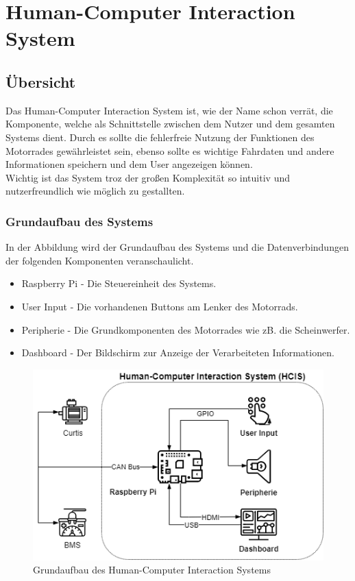 \chapter{Human-Computer Interaction System}
\section{Übersicht}
Das Human-Computer Interaction System ist, wie der Name schon verrät, die Komponente, welche als Schnittstelle zwischen dem Nutzer und dem gesamten Systems dient. Durch es sollte die fehlerfreie Nutzung der Funktionen des Motorrades gewährleistet sein, ebenso sollte es wichtige Fahrdaten und andere Informationen speichern und dem User angezeigen können.\\ Wichtig ist das System troz der großen Komplexität so intuitiv und nutzerfreundlich wie möglich zu gestallten.

\subsection{Grundaufbau des Systems}



In der Abbildung wird der Grundaufbau des Systems und die Datenverbindungen der folgenden  Komponenten veranschaulicht.
\begin{itemize}
	\item Raspberry Pi - Die Steuereinheit des Systems.
	\item User Input - Die vorhandenen Buttons am Lenker des Motorrads.
	\item Peripherie - Die Grundkomponenten des Motorrades wie zB. die Scheinwerfer. 
	\item Dashboard - Der Bildschirm zur Anzeige der Verarbeiteten Informationen.
\end{itemize}

\begin{figure}[H]
	\begin{center}
		\includegraphics[scale=0.5]{figures/hcis/HCIS_Grundfunktion.png}
		\caption{Grundaufbau des Human-Computer Interaction Systems}
	\end{center}
\end{figure}

